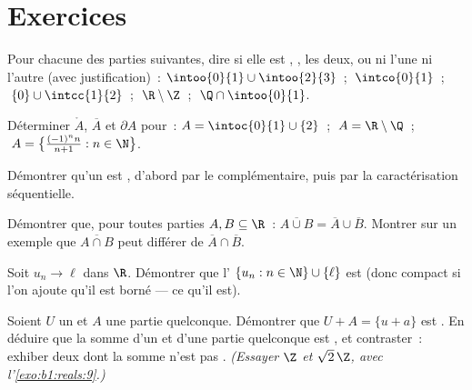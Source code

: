 \section{Exercices}

\begin{exercise}[$\star$]\label{exo:b1:topology:1}
Pour chacune des parties suivantes, dire si elle est , ,
les deux, ou ni l'une ni l'autre (avec justification)~:
$\intoo{0}{1} \cup \intoo{2}{3}$~; $\;\intco{0}{1}$~;
$\;\{0\} \cup \intcc{1}{2}$~; $\;\R \setminus \Z$~; $\;\Q \cap
\intoo{0}{1}$.
\end{exercise}

\begin{exercise}[$\star$]\label{exo:b1:topology:2}
Déterminer $\mathring A$, $\overline A$ et $\partial A$ pour~:
$A = \intoc{0}{1} \cup \{2\}$~; $\;A = \R \setminus \Q$~;
$\;A = \bigl\{\frac{(-1)^n n}{n+1} : n \in \N\bigr\}$.
\end{exercise}

\begin{exercise}[$\star$]\label{exo:b1:topology:3}
Démontrer qu'un  est , d'abord par le
complémentaire, puis par la caractérisation séquentielle.
\end{exercise}

\begin{exercise}[$\star$]\label{exo:b1:topology:4}
Démontrer que, pour toutes parties $A, B \subseteq \R$~:
$\overline{A \cup B} = \overline A \cup \overline B$. Montrer sur un
exemple que $\overline{A \cap B}$ peut différer de $\overline A \cap
\overline B$.
\end{exercise}

\begin{exercise}[$\star\star$]\label{exo:b1:topology:5}
Soit $u_n \to \ell$ dans $\R$. Démontrer que l' $\{u_n : n \in
\N\} \cup \{\ell\}$ est  (donc compact si l'on ajoute qu'il est
borné --- ce qu'il est).
\end{exercise}

\begin{exercise}[$\star\star$]\label{exo:b1:topology:6}
Soient $U$ un  et $A$ une partie quelconque. Démontrer que
$U + A = \{u + a\}$ est . En déduire que la somme d'un  et
d'une partie quelconque est , et contraster~: exhiber deux
\emph{} dont la somme n'est pas .
\emph{(Essayer $\Z$ et $\sqrt 2\,\Z$, avec l'\cref{exo:b1:reals:9}.)}
\end{exercise}

